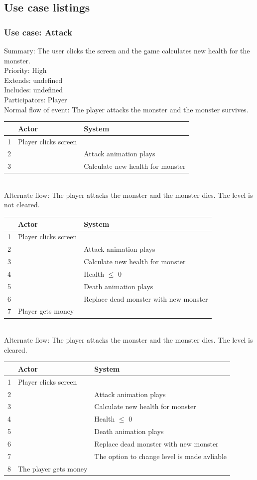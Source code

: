 \documentclass{article}
\begin{document}
\subsection{Use case listings}
\subsubsection{Use case: Attack}
Summary: The user clicks the screen and the game calculates new health for the monster.\\
Priority: High\\
Extends: undefined\\
Includes: undefined\\
Participators: Player\\
Normal flow of event: The player attacks the monster and the monster survives.
\begin{tabular}{| c | l | l |} \hline
    & Actor & System \\ \hline
    1 & Player clicks screen & \\ \hline
    2 & & Attack animation plays \\ \hline
    3 & & Calculate new health for monster\\ \hline
\end{tabular}\\
Alternate flow: The player attacks the monster and the monster dies. The level is not cleared.\\
\begin{tabular}{| c | l | l |} \hline
    & Actor & System \\ \hline
    1 & Player clicks screen & \\ \hline
    2 & & Attack animation plays \\ \hline
    3 & & Calculate new health for monster\\ \hline
    4 & & Health $\le$ 0 \\ \hline
    5 & & Death animation plays \\ \hline 
    6 & & Replace dead monster with new monster \\ \hline
    7 & Player gets money & \\ \hline
\end{tabular}\\
Alternate flow: The player attacks the monster and the monster dies. The level is cleared.\\
\begin{tabular}{| c | l | l |} \hline
    & Actor & System \\ \hline
    1 & Player clicks screen & \\ \hline
    2 & & Attack animation plays \\ \hline
    3 & & Calculate new health for monster\\ \hline
    4 & & Health $\le$ 0 \\ \hline
    5 & & Death animation plays \\ \hline 
    6 & & Replace dead monster with new monster \\ \hline
    7 & & The option to change level is made avliable\\ \hline
    8 & The player gets money & \\ \hline
\end{tabular}
\end{document}
